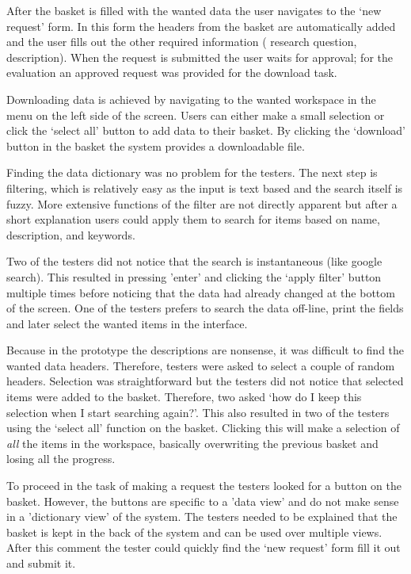 After the basket is filled with the wanted data the user navigates to the `new request' form.
In this form the headers from the basket are automatically added and the user fills out the other required information (\eg{} research question, description).
When the request is submitted the user waits for approval; for the evaluation an approved request was provided for the download task.

Downloading data is achieved by navigating to the wanted workspace in the menu on the left side of the screen.
Users can either make a small selection or click the `select all' button to add data to their basket.
By clicking the `download' button in the basket the system provides a downloadable file.

Finding the data dictionary was no problem for the testers.
The next step is filtering, which is relatively easy as the input is text based and the search itself is fuzzy.
More extensive functions of the filter are not directly apparent but after a short explanation users could apply them to search for items based on name, description, and keywords.

Two of the testers did not notice that the search is instantaneous (like google search).
This resulted in pressing 'enter' and clicking the `apply filter' button multiple times before noticing that the data had already changed at the bottom of the screen.
One of the testers prefers to search the data off-line, \ie{} print the fields and later select the wanted items in the interface.

Because in the prototype the descriptions are nonsense, it was difficult to find the wanted data headers.
Therefore, testers were asked to select a couple of random headers.
Selection was straightforward but the testers did not notice that selected items were added to the basket.
Therefore, two asked `how do I keep this selection when I start searching again?'.
This also resulted in two of the testers using the `select all' function on the basket.
Clicking this will make a selection of \emph{all} the items in the workspace, basically overwriting the previous basket and losing all the progress.

To proceed in the task of making a request the testers looked for a button on the basket.
However, the buttons are specific to a 'data view' and do not make sense in a 'dictionary view' of the system.
The testers needed to be explained that the basket is kept in the back of the system and can be used over multiple views.
After this comment the tester could quickly find the `new request' form fill it out and submit it.

